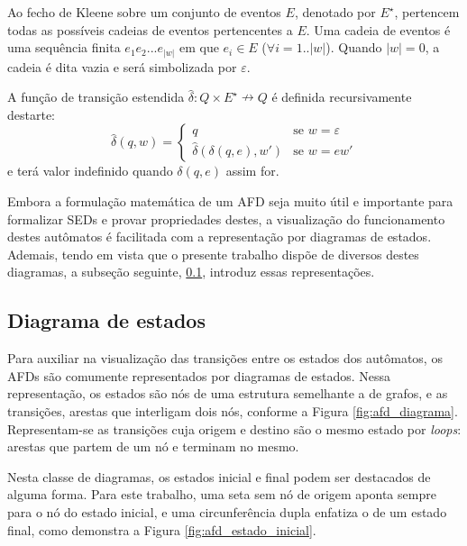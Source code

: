 Ao fecho de Kleene sobre um conjunto de eventos $E$, denotado por $E^\star$, pertencem todas as possíveis cadeias de eventos pertencentes a $E$. Uma cadeia de eventos é uma sequência finita $e_1 e_2 ... e_{|w|}$ em que $e_i \in E$ ($\forall i = 1..|w|$). Quando $|w| = 0$, a cadeia é dita vazia e será simbolizada por $\varepsilon$.

A função de transição estendida $\hat{\delta}:Q \times E^\star \nrightarrow Q$ é definida recursivamente destarte: $$\hat{\delta}(q, w) = \begin{cases}
q & \text{se $w=\varepsilon$} \\
\hat{\delta}(\delta(q, e), w') & \text{se $w=e w'$}
\end{cases}$$ e terá valor indefinido quando $\delta(q, e)$ assim for.

Embora a formulação matemática de um AFD seja muito útil e importante para formalizar SEDs e provar propriedades destes, a visualização do funcionamento destes autômatos é facilitada com a representação por diagramas de estados. Ademais, tendo em vista que o presente trabalho dispõe de diversos destes diagramas, a subseção seguinte, \ref{subsec:diagramas}, introduz essas representações.

\subsection{Diagrama de estados}
\label{subsec:diagramas}

Para auxiliar na visualização das transições entre os estados dos autômatos, os AFDs são comumente representados por diagramas de estados. Nessa representação, os estados são nós de uma estrutura semelhante a de grafos, e as transições, arestas que interligam dois nós, conforme a Figura \ref{fig:afd_diagrama}. Representam-se as transições cuja origem e destino são o mesmo estado por \textit{loops}: arestas que partem de um nó e terminam no mesmo.


Nesta classe de diagramas, os estados inicial e final podem ser destacados de alguma forma. Para este trabalho, uma seta sem nó de origem aponta sempre para o nó do estado inicial, e uma circunferência dupla enfatiza o de um estado final, como demonstra a Figura \ref{fig:afd_estado_inicial}.

